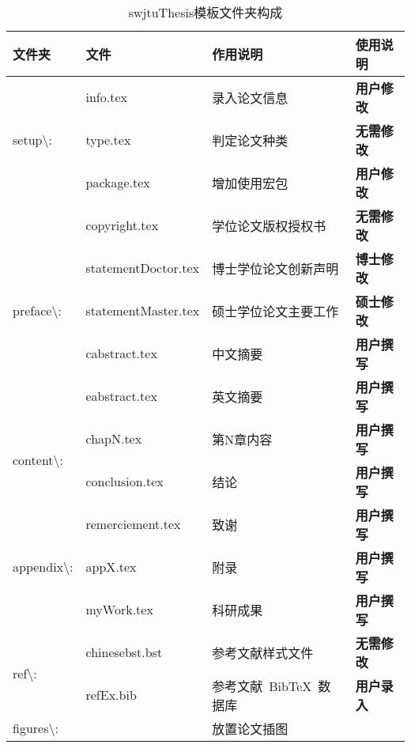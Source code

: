 \begin{table}[htbp]
	\setlength{\abovecaptionskip}{0pt}
	\setlength{\belowcaptionskip}{0pt}\
	\caption{swjtuThesis模板文件夹构成}
	\label{tab_1_1_files}
	\centering
	\begin{tabular}{llll}
		\toprule
		文件夹 & 文件 & 作用说明 & 使用说明 \\
		\midrule
		\multirow{3}{*}{\centering setup\textbackslash{}:} & info.tex & 录入论文信息 & \textbf{用户修改} \\
		& type.tex & 判定论文种类 & \textbf{无需修改} \\
	    & package.tex & 增加使用宏包 & \textbf{用户修改} \\
	    \midrule
	    \multirow{5}{*}{\centering preface\textbackslash{}:} & copyright.tex & 学位论文版权授权书 & \textbf{无需修改} \\
	    & statementDoctor.tex & 博士学位论文创新声明 & \textbf{博士修改} \\
	    & statementMaster.tex & 硕士学位论文主要工作 & \textbf{硕士修改} \\
	    & cabstract.tex & 中文摘要 & \textbf{用户撰写} \\
	    & eabstract.tex & 英文摘要 & \textbf{用户撰写} \\
	    \midrule
	    \multirow{2}{*}{\centering content\textbackslash{}:} & chapN.tex & 第N章内容 & \textbf{用户撰写} \\
	    & conclusion.tex & 结论 & \textbf{用户撰写} \\
	    \midrule
	    \multirow{3}{*}{\centering appendix\textbackslash{}:} & remerciement.tex & 致谢 & \textbf{用户撰写} \\
	    & appX.tex & 附录 & \textbf{用户撰写} \\
	    & myWork.tex & 科研成果 & \textbf{用户撰写} \\
	    \midrule
	    \multirow{2}{*}{\centering ref\textbackslash{}:} & chinesebst.bst & 参考文献样式文件 & \textbf{无需修改} \\
	    & refEx.bib & 参考文献~BibTeX~数据库 & \textbf{用户录入}\\
	    \midrule
	    figures\textbackslash{}: &  & 放置论文插图 \\
		\bottomrule
	\end{tabular}
\end{table}




